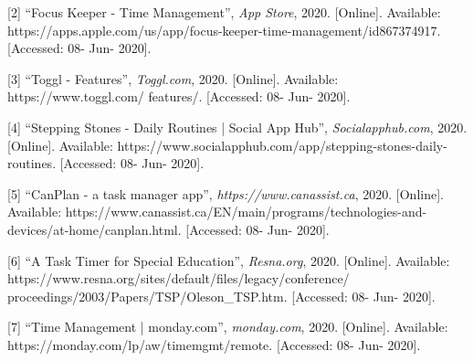 \documentclass{sigchi}
\begin{document}
[2] ``Focus Keeper - Time Management'', \textit{App Store}, 2020. [Online]. Available: https://apps.apple.com/us/app/focus-keeper-time-management/id867374917. [Accessed: 08- Jun- 2020].

[3] ``Toggl - Features'', \textit{Toggl.com}, 2020. [Online]. Available: https://www.toggl.com/
features/. [Accessed: 08- Jun- 2020].

[4] ``Stepping Stones - Daily Routines | Social App Hub'', \textit{Socialapphub.com}, 2020. [Online]. Available: https://www.socialapphub.com/app/stepping-stones-daily-routines. [Accessed: 08- Jun- 2020].

[5] ``CanPlan - a task manager app'', \textit{https://www.canassist.ca}, 2020. [Online]. Available: https://www.canassist.ca/EN/main/programs/technologies-and-devices/at-home/canplan.html. [Accessed: 08- Jun- 2020].

[6] ``A Task Timer for Special Education'', \textit{Resna.org}, 2020. [Online]. Available: https://www.resna.org/sites/default/files/legacy/conference/
proceedings/2003/Papers/TSP/Oleson\_TSP.htm. [Accessed: 08- Jun- 2020].

[7] ``Time Management | monday.com'', \textit{monday.com}, 2020. [Online]. Available: https://monday.com/lp/aw/timemgmt/remote. [Accessed: 08- Jun- 2020].
\end{document}
